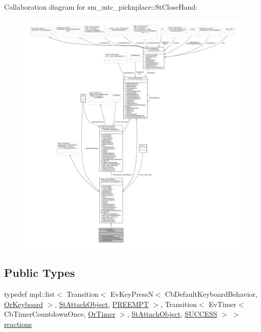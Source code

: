 Collaboration diagram for sm\+\_\+mtc\+\_\+picknplace\+:\+:St\+Close\+Hand\+:
\nopagebreak
\begin{figure}[H]
\begin{center}
\leavevmode
\includegraphics[width=350pt]{structsm__mtc__picknplace_1_1StCloseHand__coll__graph}
\end{center}
\end{figure}
\subsection*{Public Types}
\begin{DoxyCompactItemize}
\item 
typedef mpl\+::list$<$ Transition$<$ Ev\+Key\+PressN$<$ Cb\+Default\+Keyboard\+Behavior, \hyperlink{classsm__mtc__picknplace_1_1OrKeyboard}{Or\+Keyboard} $>$, \hyperlink{structsm__mtc__picknplace_1_1StAttachObject}{St\+Attach\+Object}, \hyperlink{classPREEMPT}{P\+R\+E\+E\+M\+PT} $>$, Transition$<$ Ev\+Timer$<$ Cb\+Timer\+Countdown\+Once, \hyperlink{classsm__mtc__picknplace_1_1OrTimer}{Or\+Timer} $>$, \hyperlink{structsm__mtc__picknplace_1_1StAttachObject}{St\+Attach\+Object}, \hyperlink{classSUCCESS}{S\+U\+C\+C\+E\+SS} $>$ $>$ \hyperlink{structsm__mtc__picknplace_1_1StCloseHand_aebd4d76728e6fc179c43d2ef9b6d7dee}{reactions}
\end{DoxyCompactItemize}
